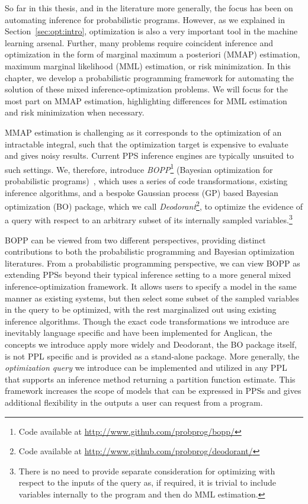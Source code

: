 
So far in this thesis, and in the literature more generally, the focus has been on automating
inference for probabilistic programs.  However, as we explained in Section~\ref{sec:opt:intro},
optimization is also a very important tool in the machine learning arsenal.  Further, many problems
require coincident inference and optimization in the form of marginal maximum a posteriori (MMAP) estimation,
maximum marginal likelihood (MML) estimation, or risk minimization.  In this chapter, we develop a probabilistic programming framework
for automating the solution of these mixed inference-optimization problems.
We will focus for the most part on
MMAP estimation, highlighting differences for MML estimation and risk minimization when necessary.

MMAP estimation is challenging as it corresponds to the optimization of an intractable integral, such that the 
optimization target is expensive to evaluate and gives noisy results.  Current PPS inference engines are 
typically unsuited to such settings.  We, therefore, introduce \emph{BOPP}\footnote{Code available at \url{http://www.github.com/probprog/bopp/}}
(Bayesian optimization for probabilistic programs)~\citep{rainforth2015workshopbopp,rainforth2016bayesian}, 
which uses a series of code transformations, existing inference algorithms,
and a bespoke Gaussian process (GP) based Bayesian optimization (BO) package, which we call \emph{Deodorant}\footnote{Code available
at \url{http://www.github.com/probprog/deodorant/}}, to optimize the evidence of a query with respect to
an arbitrary subset of its internally sampled variables.\footnote{There is no need to
	provide separate consideration for optimizing with respect to the inputs of the query as, if required,
	it is trivial to include variables internally to the program and then do MML estimation.}

BOPP can be viewed from two different perspectives, providing distinct contributions to both the probabilistic
programming and Bayesian optimization literatures.  From a probabilistic programming perspective, we can
view BOPP as extending PPSs beyond their typical inference setting to a more
general mixed inference-optimization framework.  It allows users to specify a model in the same manner 
as existing systems, but then select some subset of the sampled variables in the query to be optimized, 
with the rest marginalized out using existing inference algorithms.  Though the exact code transformations we
introduce are inevitably language specific and have been implemented for Anglican, the concepts we
introduce apply more widely and Deodorant, the BO package itself, is not PPL specific and is provided
as a stand-alone package.  More generally, the \textit{optimization query} we 
introduce can be implemented and utilized in any PPL that supports an inference method returning a 
partition function estimate.  This framework increases the scope of models that can be expressed in
PPSs and gives additional flexibility in the outputs a user can request from a program.

